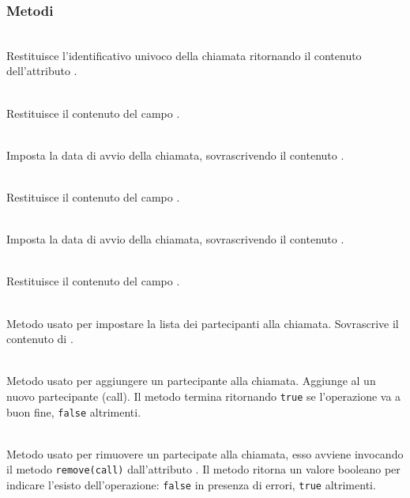 \subsubsection*{Metodi}
\begin{description}
	\item{}\\
	Restituisce l'identificativo univoco della chiamata ritornando il contenuto dell'attributo .
	\item{}\\
	Restituisce il contenuto del campo .
	\item{}\\
	Imposta la data di avvio della chiamata, sovrascrivendo il contenuto .
	\item{}\\
	Restituisce il contenuto del campo .
	\item{}\\
	Imposta la data di avvio della chiamata, sovrascrivendo il contenuto .
	\item{}\\
	Restituisce il contenuto del campo .
	\item{}\\
	Metodo usato per impostare la lista dei partecipanti alla chiamata. Sovrascrive il contenuto di .
	\item{}\\
	Metodo usato per aggiungere un partecipante alla chiamata. Aggiunge al  un nuovo partecipante (call). Il metodo termina ritornando \texttt{true} se l'operazione va a buon fine, \texttt{false} altrimenti.
	\item{}\\
	Metodo usato per rimuovere un partecipate alla chiamata, esso avviene invocando il metodo \texttt{remove(call)} dall'attributo . Il metodo ritorna un valore booleano per indicare l'esisto dell'operazione: \texttt{false} in presenza di errori, \texttt{true} altrimenti.
\end{description}


